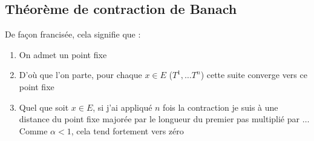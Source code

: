 \subsection{Théorème de contraction de Banach}
\newpage
De façon francisée, cela signifie que :
\begin{enumerate}
	\item On admet un point fixe
	\item D’où que l'on parte, pour chaque $x \in E$ ($T^1, \dots T^n$) cette suite
	      converge vers ce point fixe
	\item Quel que soit $x \in E$, si j'ai appliqué $n$ fois la contraction je suis 
	      à une distance du point fixe majorée par le longueur du premier pas multiplié par
	      $\dots$ Comme $\alpha < 1$, cela tend fortement vers zéro
\end{enumerate}
	
